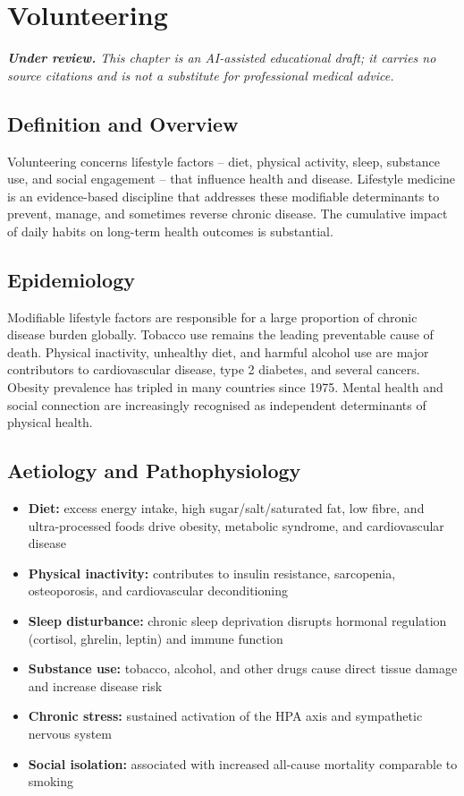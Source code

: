\chapter{Volunteering}

\medskip
\noindent\textit{\textbf{Under review.} This chapter is an AI-assisted educational draft; it carries no source citations and is not a substitute for professional medical advice.}

\section*{Definition and Overview}
Volunteering concerns lifestyle factors -- diet, physical activity, sleep, substance use, and social engagement -- that influence health and disease. Lifestyle medicine is an evidence-based discipline that addresses these modifiable determinants to prevent, manage, and sometimes reverse chronic disease. The cumulative impact of daily habits on long-term health outcomes is substantial.

\section*{Epidemiology}
Modifiable lifestyle factors are responsible for a large proportion of chronic disease burden globally. Tobacco use remains the leading preventable cause of death. Physical inactivity, unhealthy diet, and harmful alcohol use are major contributors to cardiovascular disease, type 2 diabetes, and several cancers. Obesity prevalence has tripled in many countries since 1975. Mental health and social connection are increasingly recognised as independent determinants of physical health.

\section*{Aetiology and Pathophysiology}
\begin{itemize}
    \item \textbf{Diet:} excess energy intake, high sugar/salt/saturated fat, low fibre, and ultra-processed foods drive obesity, metabolic syndrome, and cardiovascular disease
    \item \textbf{Physical inactivity:} contributes to insulin resistance, sarcopenia, osteoporosis, and cardiovascular deconditioning
    \item \textbf{Sleep disturbance:} chronic sleep deprivation disrupts hormonal regulation (cortisol, ghrelin, leptin) and immune function
    \item \textbf{Substance use:} tobacco, alcohol, and other drugs cause direct tissue damage and increase disease risk
    \item \textbf{Chronic stress:} sustained activation of the HPA axis and sympathetic nervous system
    \item \textbf{Social isolation:} associated with increased all-cause mortality comparable to smoking
\end{itemize}

